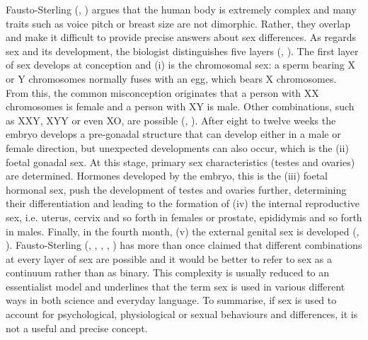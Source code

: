 Fausto-Sterling (\cite*[66]{fausto2012sex}, \cite*[190]{fausto2016critiques}) argues that the human body is extremely complex and many traits such as voice pitch or breast size are not dimorphic. Rather, they overlap and make it difficult to provide precise answers about sex differences. As regards sex and its development, the biologist distinguishes five layers (\cite[3]{fausto2012sex}, \cite*{fausto2018why}). The first layer of sex develops at conception and (i) is the chromosomal sex: a sperm bearing X or Y chromosomes normally fuses with an egg, which bears X chromosomes. From this, the common misconception originates that a person with XX chromosomes is female and a person with XY is male. Other combinations, such as XXY, XYY or even XO, are possible (\cite[25]{fausto2012sex}, \cite*{fausto2018why}). After eight to twelve weeks the embryo develops a pre-gonadal structure that can develop either in a male or female direction, but unexpected developments can also occur, which is the (ii) foetal gonadal sex. At this stage, primary sex characteristics (testes and ovaries) are determined. Hormones developed by the embryo, this is the (iii) foetal hormonal sex, push the development of testes and ovaries further, determining their differentiation and leading to the formation of (iv) the internal reproductive sex, i.e. uterus, cervix and so forth in females or prostate, epididymis and so forth in males. Finally, in the fourth month, (v) the external genital sex is developed (\cite[5]{fausto2012sex}, \cite*{fausto2018why}). Fausto-Sterling (\cite*[20]{fausto1993five}, \cite*[20]{fausto2000five}, \cite*[11]{fausto2012sex}, \cite*[190]{fausto2016critiques}, \cite*{fausto2018why}) has more than once claimed that different combinations at every layer of sex are possible and it would be better to refer to sex as a continuum rather than as binary. This complexity is usually reduced to an essentialist model and \textcite[190]{fausto2016critiques} underlines that the term sex is used in various different ways in both science and everyday language. To summarise, if sex is used to account for psychological, physiological or sexual behaviours and differences, it is not a useful and precise concept.

